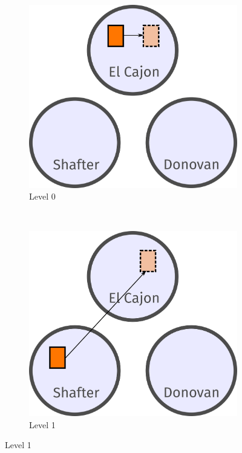 \documentclass[journal abbreviation, manuscript]{copernicus}
\begin{document}
\begin{figure}
\begin{subfigure}{0.23\textwidth}
\includegraphics[width=\textwidth]{writeup/img/level0.png}
\caption{Level 0}
\end{subfigure}
~
\begin{subfigure}{0.23\textwidth}
\includegraphics[width=\textwidth]{writeup/img/level1.png}
\caption{Level 1}
\end{subfigure}

\end{figure}
\end{document}
